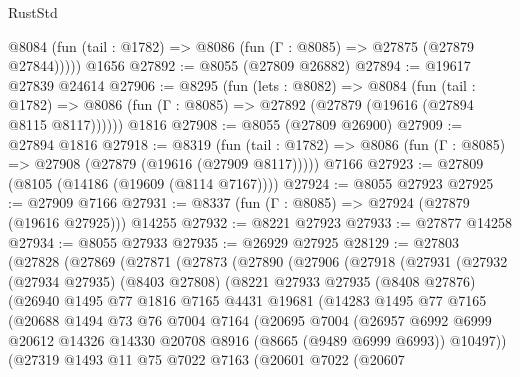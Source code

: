 \begin{lexlean}{RustStd}
\begin{coremodule}
      @8084 (fun (tail : @1782) => @8086 (fun (Γ : @8085) => @27875 (@27879 @27844)))))
    @1656
@27892 := @8055 (@27809 @26882)
@27894 := @19617 @27839 @24614
@27906 := @8295
    (fun (lets : @8082) =>
    @8084
      (fun (tail : @1782) =>
      @8086 (fun (Γ : @8085) => @27892 (@27879 (@19616 (@27894 @8115 @8117))))))
    @1816
@27908 := @8055 (@27809 @26900)
@27909 := @27894 @1816
@27918 := @8319
    (fun (tail : @1782) => @8086 (fun (Γ : @8085) => @27908 (@27879 (@19616 (@27909 @8117)))))
    @7166
@27923 := @27809 (@8105 (@14186 (@19609 (@8114 @7167))))
@27924 := @8055 @27923
@27925 := @27909 @7166
@27931 := @8337 (fun (Γ : @8085) => @27924 (@27879 (@19616 @27925))) @14255
@27932 := @8221 @27923
@27933 := @27877 @14258
@27934 := @8055 @27933
@27935 := @26929 @27925
@28129 := @27803
    (@27828
      (@27869
        (@27871
          (@27873
            (@27890
              (@27906
                (@27918
                  (@27931
                    (@27932
                      (@27934 @27935)
                      (@8403 @27808)
                      (@8221
                        @27933
                        @27935
                        (@8408 @27876)
                        (@26940
                          @1495
                          @77
                          @1816
                          @7165
                          @4431
                          @19681
                          (@14283
                            @1495
                            @77
                            @7165
                            (@20688
                              @1494
                              @73
                              @76
                              @7004
                              @7164
                              (@20695
                                @7004
                                (@26957
                                  @6992
                                  @6999
                                  @20612
                                  @14326
                                  @14330
                                  @20708
                                  @8916
                                  (@8665 (@9489 @6999 @6993))
                                  @10497))
                              (@27319
                                @1493
                                @11
                                @75
                                @7022
                                @7163
                                (@20601
                                  @7022
                                  (@20607

\end{coremodule}
\end{lexlean}
